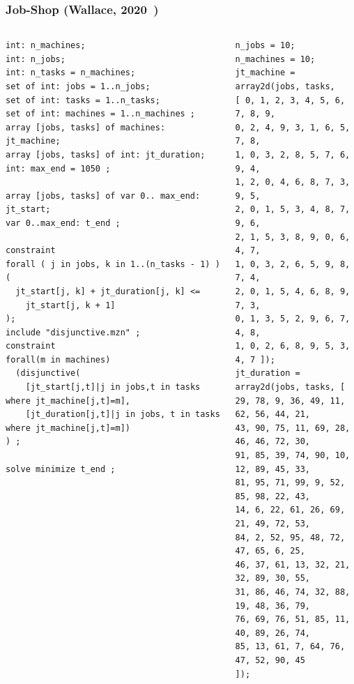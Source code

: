 \documentclass[dvipsnames,aspectratio=169]{beamer}
\begin{document}
\begin{frame}[fragile]
\frametitle{Job-Shop (Wallace, 2020~\cite{DBLP:books/sp/Wallace20})}
\begin{columns}
\begin{column}{0.5\textwidth}
{\tiny
\begin{verbatim}
int: n_machines; 
int: n_jobs; 
int: n_tasks = n_machines; 
set of int: jobs = 1..n_jobs;
set of int: tasks = 1..n_tasks;
set of int: machines = 1..n_machines ;
array [jobs, tasks] of machines: jt_machine;
array [jobs, tasks] of int: jt_duration;
int: max_end = 1050 ;

array [jobs, tasks] of var 0.. max_end: jt_start;
var 0..max_end: t_end ;

constraint
forall ( j in jobs, k in 1..(n_tasks - 1) ) (
  jt_start[j, k] + jt_duration[j, k] <=
    jt_start[j, k + 1]
);
include "disjunctive.mzn" ;
constraint
forall(m in machines)
  (disjunctive(
    [jt_start[j,t]|j in jobs,t in tasks where jt_machine[j,t]=m],
    [jt_duration[j,t]|j in jobs, t in tasks where jt_machine[j,t]=m])
) ;

solve minimize t_end ;
\end{verbatim}
}
\end{column}
\begin{column}{0.5\textwidth}
{\tiny
\begin{verbatim}
n_jobs = 10;
n_machines = 10;
jt_machine = array2d(jobs, tasks,
[ 0, 1, 2, 3, 4, 5, 6, 7, 8, 9,
0, 2, 4, 9, 3, 1, 6, 5, 7, 8,
1, 0, 3, 2, 8, 5, 7, 6, 9, 4,
1, 2, 0, 4, 6, 8, 7, 3, 9, 5,
2, 0, 1, 5, 3, 4, 8, 7, 9, 6,
2, 1, 5, 3, 8, 9, 0, 6, 4, 7,
1, 0, 3, 2, 6, 5, 9, 8, 7, 4,
2, 0, 1, 5, 4, 6, 8, 9, 7, 3,
0, 1, 3, 5, 2, 9, 6, 7, 4, 8,
1, 0, 2, 6, 8, 9, 5, 3, 4, 7 ]);
jt_duration = array2d(jobs, tasks, [
29, 78, 9, 36, 49, 11, 62, 56, 44, 21,
43, 90, 75, 11, 69, 28, 46, 46, 72, 30,
91, 85, 39, 74, 90, 10, 12, 89, 45, 33,
81, 95, 71, 99, 9, 52, 85, 98, 22, 43,
14, 6, 22, 61, 26, 69, 21, 49, 72, 53,
84, 2, 52, 95, 48, 72, 47, 65, 6, 25,
46, 37, 61, 13, 32, 21, 32, 89, 30, 55,
31, 86, 46, 74, 32, 88, 19, 48, 36, 79,
76, 69, 76, 51, 85, 11, 40, 89, 26, 74,
85, 13, 61, 7, 64, 76, 47, 52, 90, 45
]);
\end{verbatim}
}
\end{column}
\end{columns}
\end{frame}
\end{document}
